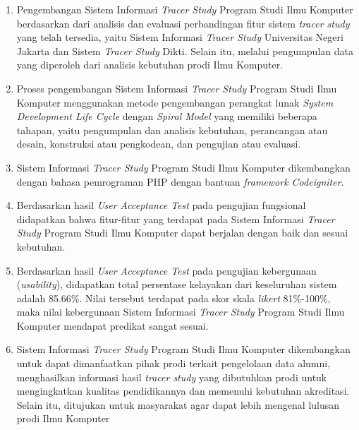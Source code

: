 \begin{enumerate}
	\item Pengembangan Sistem Informasi \textit{Tracer Study} Program Studi Ilmu Komputer berdasarkan dari analisis dan evaluasi perbandingan fitur sistem \textit{tracer study} yang telah tersedia, yaitu Sistem Informasi \textit{Tracer Study} Universitas Negeri Jakarta dan Sistem \textit{Tracer Study} Dikti. Selain itu, melalui pengumpulan data yang diperoleh dari analisis kebutuhan prodi Ilmu Komputer. 
	
	\item Proses pengembangan Sistem Informasi \textit{Tracer Study} Program Studi Ilmu Komputer menggunakan metode pengembangan perangkat lunak \textit{System Development Life Cycle} dengan \textit{Spiral Model} yang memiliki beberapa tahapan, yaitu pengumpulan dan analisis kebutuhan, perancangan atau desain, konstruksi atau pengkodean, dan pengujian atau evaluasi.
	
	\item Sistem Informasi \textit{Tracer Study} Program Studi Ilmu Komputer dikembangkan dengan bahasa pemrograman PHP dengan bantuan \textit{framework Codeigniter}. %
	
	\item Berdasarkan hasil \textit{User Acceptance Test} pada pengujian fungsional didapatkan bahwa fitur-fitur yang terdapat pada Sistem Informasi \textit{Tracer Study} Program Studi Ilmu Komputer dapat berjalan dengan baik dan sesuai kebutuhan.
	
	\item Berdasarkan hasil \textit{User Acceptance Test} pada pengujian kebergunaan (\textit{usability}), didapatkan total persentase kelayakan dari keseluruhan sistem adalah 85.66\%. Nilai tersebut terdapat pada skor skala \textit{likert} 81\%-100\%, maka nilai kebergunaan Sistem Informasi \textit{Tracer Study} Program Studi Ilmu Komputer mendapat predikat sangat sesuai.
	
	\item  Sistem Informasi \textit{Tracer Study} Program Studi Ilmu Komputer dikembangkan untuk dapat dimanfaatkan pihak prodi terkait pengelolaan data alumni, menghasilkan informasi hasil \textit{tracer study} yang dibutuhkan prodi untuk mengingkatkan kualitas pendidikannya dan memenuhi kebutuhan akreditasi. Selain itu, ditujukan untuk masyarakat agar dapat lebih mengenal lulusan prodi Ilmu Komputer

\end{enumerate}


